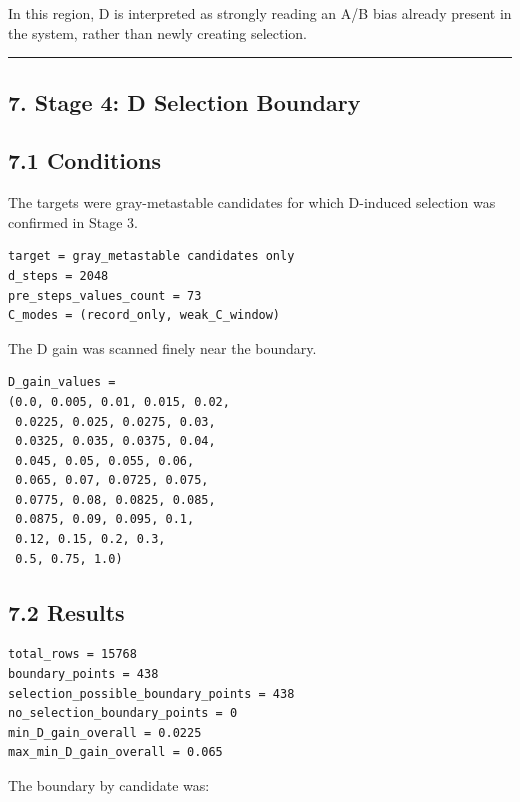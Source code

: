 \documentclass{article}
\begin{document}
In this region, D is interpreted as strongly reading an A/B bias already
present in the system, rather than newly creating selection.

\begin{center}\rule{0.5\linewidth}{0.5pt}\end{center}

\subsection{7. Stage 4: D Selection
Boundary}\label{stage-4-d-selection-boundary}

\subsection{7.1 Conditions}\label{conditions-3}

The targets were gray-metastable candidates for which D-induced
selection was confirmed in Stage 3.

\begin{verbatim}
target = gray_metastable candidates only
d_steps = 2048
pre_steps_values_count = 73
C_modes = (record_only, weak_C_window)
\end{verbatim}

The D gain was scanned finely near the boundary.

\begin{verbatim}
D_gain_values =
(0.0, 0.005, 0.01, 0.015, 0.02,
 0.0225, 0.025, 0.0275, 0.03,
 0.0325, 0.035, 0.0375, 0.04,
 0.045, 0.05, 0.055, 0.06,
 0.065, 0.07, 0.0725, 0.075,
 0.0775, 0.08, 0.0825, 0.085,
 0.0875, 0.09, 0.095, 0.1,
 0.12, 0.15, 0.2, 0.3,
 0.5, 0.75, 1.0)
\end{verbatim}

\subsection{7.2 Results}\label{results-2}

\begin{verbatim}
total_rows = 15768
boundary_points = 438
selection_possible_boundary_points = 438
no_selection_boundary_points = 0
min_D_gain_overall = 0.0225
max_min_D_gain_overall = 0.065
\end{verbatim}

The boundary by candidate was:
\end{document}
